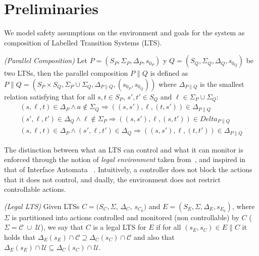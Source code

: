 \section{Preliminaries}


We model safety assumptions on the environment and goals for the system as composition of Labelled Transition Systems (LTS). 
%
\begin{definition}\label{def:parallelComposition}\emph{(Parallel Composition)}
	Let $P=(S_P,\Sigma_P,\Delta_P,s_{0_P})$ y $Q=(S_Q,\Sigma_Q,\Delta_Q,s_{0_Q})$ be two LTSs, then 
	the parallel composition $P\|Q$ is defined as $P \| Q = (S_P \times S_Q, \Sigma_P \cup \Sigma_Q, \Delta_{P\|Q}, (s_{0_P}, s_{0_Q}))$
	where $\Delta_{P\|Q}$ is the smallest relation satisfying that for all $s, t \in S_P$, $s',t' \in S_Q$ and $\ell \in \Sigma_P \cup \Sigma_Q$:
	\small
	\begin{gather*}
	(s,\ell,t) \in \Delta_{P} \wedge a \not\in \Sigma_Q \Rightarrow ((s,s'),\ell,(t,s')) \in \Delta_{P\|Q}\\
	(s',\ell,t') \in \Delta_{Q} \wedge \ell \not\in \Sigma_P \Rightarrow ((s,s'),\ell,(s,t')) \in Delta_{P\|Q}\\
	(s,\ell,t) \in \Delta_{P} \wedge (s',\ell,t') \in \Delta_{Q} \Rightarrow ((s,s'),\ell,(t,t')) \in \Delta_{P\|Q} 
	\end{gather*}
	\normalsize
\end{definition}


The distinction between what an LTS can control and what it can monitor is enforced through the notion of 
{\em legal environment} taken from~\cite{DIppolito:2013}, and inspired in that of Interface Automata ~\cite{DBLP:conf/sigsoft/AlfaroH01}.
Intuitively, a controller does not block the actions that it does not control, and dually, the environment does not restrict controllable actions. 

\begin{definition} \label{def:IALTS} \emph{(Legal LTS)}
	Given LTSs $C = (S_C, \Sigma$, $\Delta_C$, $s_{C_0})$ and $E = (S_E,\Sigma,\Delta_E,s_{E_0})$, where $\Sigma$ is partitioned into actions controlled and monitored (non controllable) by $C$ ($\Sigma=\mathcal{C} \; \cup \;\mathcal{U}$), we say that $C$ is a legal LTS for $E$ if for all $(s_E,s_C) \in E\|C$ it holds that
	$\Delta_{E}(s_E)\cap \mathcal{C} \supseteq \Delta_{C}(s_C)\cap \mathcal{C}$ and also that  $\Delta_{E}(s_E)\cap \mathcal{U} \subseteq \Delta_{C}(s_C)\cap \mathcal{U}$.
	
\end{definition}


